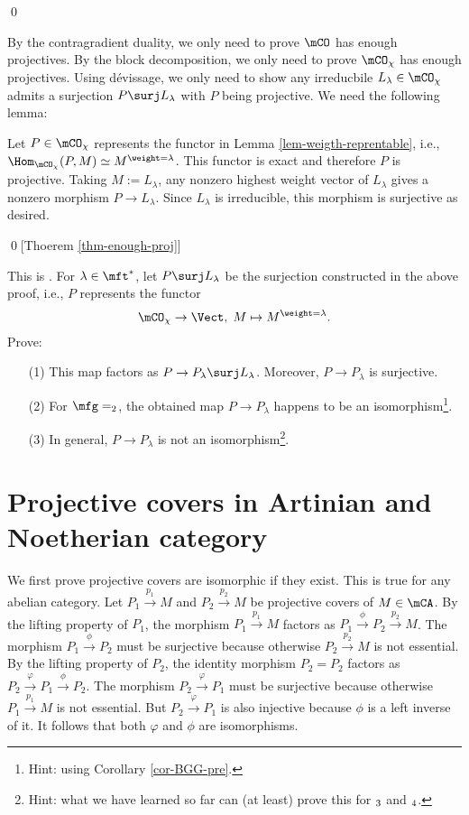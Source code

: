 	\qed

		By the contragradient duality, we only need to prove $\mCO$ has enough projectives. By the block decomposition, we only need to prove $\mCO_\chi$ has enough projectives. Using dévissage, we only need to show any irreducbile $L_\lambda\in \mCO_\chi$ admits a surjection $P\surj L_\lambda$ with $P$ being projective. We need the following lemma:

		Let $P\in \mCO_\chi$ represents the functor in Lemma \ref{lem-weigth-reprentable}, i.e., $\Hom_{\mCO_\chi}(P,M) \simeq M^{\weight = \lambda}$. This functor is exact and therefore $P$ is projective. Taking $M:= L_\lambda$, any nonzero highest weight vector of $L_\lambda$ gives a nonzero morphism $P\to L_\lambda$. Since $L_\lambda$ is irreducible, this morphism is surjective as desired.
		
	\qed[Thoerem \ref{thm-enough-proj}]

	\begin{exe}
		This is . For $\lambda\in \mft^*$, let $P\surj L_\lambda$ be the surjection constructed in the above proof, i.e., $P$ represents the functor
		\[
			\mCO_\chi \to \Vect,\; M \mapsto M^{\weight = \lambda}.
		\]
		Prove:
		\begin{itemize}
			\item[(1)]
				This map factors as $P \to P_\lambda \surj L_\lambda$. Moreover, $P\to P_\lambda$ is surjective.
			\item[(2)]
				For $\mfg=\sl_2$, the obtained map $P\to P_\lambda$ happens to be an isomorphism\footnote{Hint: using Corollary \ref{cor-BGG-pre}.}.
			\item[(3)]
				In general, $P\to P_\lambda$ is not an isomorphism\footnote{Hint: what we have learned so far can (at least) prove this for $\sl_3$ and $\sl_4$.}.
		\end{itemize}

	\end{exe}

\appendix
\section{Projective covers in Artinian and Noetherian category}


		We first prove projective covers are isomorphic if they exist. This is true for any abelian category. Let $P_1\xrightarrow{p_1} M$ and $P_2\xrightarrow{p_2} M$ be projective covers of $M\in\mCA$. By the lifting property of $P_1$, the morphism $P_1\xrightarrow{p_1} M$ factors as $P_1 \xrightarrow{\phi} P_2 \xrightarrow{p_2} M$. The morphism $P_1\xrightarrow{\phi} P_2$ must be surjective because otherwise $P_2\xrightarrow{p_2} M$ is not essential. By the lifting property of $P_2$, the identity morphism $P_2 = P_2$ factors as $P_2 \xrightarrow{\varphi} P_1 \xrightarrow{\phi} P_2$. The morphism $P_2 \xrightarrow{\varphi} P_1 $ must be surjective because otherwise $P_1\xrightarrow{p_1} M$ is not essential. But $P_2 \xrightarrow{\varphi} P_1 $ is also injective because $\phi$ is a left inverse of it. It follows that both $\varphi$ and $\phi$ are isomorphisms.

